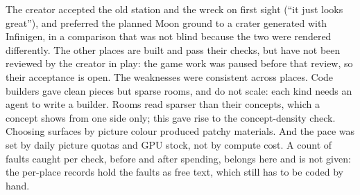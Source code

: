 The creator accepted the old station and the wreck on first sight (``it just looks great''), and preferred the planned Moon ground to a crater generated with Infinigen, in a comparison that was not blind because the two were rendered differently. The other places are built and pass their checks, but have not been reviewed by the creator in play: the game work was paused before that review, so their acceptance is open. The weaknesses were consistent across places. Code builders gave clean pieces but sparse rooms, and do not scale: each kind needs an agent to write a builder. Rooms read sparser than their concepts, which a concept shows from one side only; this gave rise to the concept-density check. Choosing surfaces by picture colour produced patchy materials. And the pace was set by daily picture quotas and GPU stock, not by compute cost. A count of faults caught per check, before and after spending, belongs here and is not given: the per-place records hold the faults as free text, which still has to be coded by hand.
